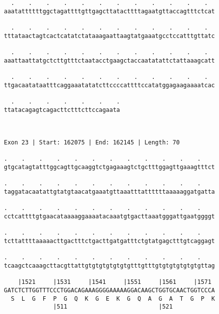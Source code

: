 \documentclass{article}
\begin{document}
\begin{Verbatim}
  .    .    .    .    .    .    .    .    .    .    .    .  
aaatattttttggctagattttgttgagcttatacttttagaatgttaccagtttctcat
                                                            
  .    .    .    .    .    .    .    .    .    .    .    .  
tttataactagtcactcatatctataaagaattaagtatgaaatgcctccatttgttatc
                                                            
  .    .    .    .    .    .    .    .    .    .    .    .  
aaattaattatgctcttgtttctaatacctgaagctaccaatatattctattaaagcatt
                                                            
  .    .    .    .    .    .    .    .    .    .    .    .  
ttgacaatataatttcaggaaatatatcttccccattttccatatggagaagaaaatcac
                                                            
  .    .    .    .    .    .    .
ttatacagagtcagacttctttcttccagaata
                                 
                                 
 
Exon 23 | Start: 162075 | End: 162145 | Length: 70
 
.    .    .    .    .    .    .    .    .    .    .    .    
gtgcatagtatttggcagttgcaaggtctgagaaagtctgctttggagttgaaagtttct
                                                            
.    .    .    .    .    .    .    .    .    .    .    .    
taggatacaatattgtatgtaacatgaaatgttaaatttattttttaaaaaggatgatta
                                                            
.    .    .    .    .    .    .    .    .    .    .    .    
cctcattttgtgaacataaaaggaaaatacaaatgtgacttaaatgggattgaatggggt
                                                            
.    .    .    .    .    .    .    .    .    .    .    .    
tcttattttaaaaacttgactttctgacttgatgatttctgtatgagctttgtcaggagt
                                                            
.    .    .    .    .    .    .    .    .    .    .    .    
tcaagctcaaagcttacgttattgtgtgtgtgtgtgtttgtttgtgtgtgtgtgtgttag
                                                            
    |1521     |1531     |1541     |1551     |1561     |1571 
GATCTCTTGGTTTCCCTGGACAGAAAGGGGAAAAAGGACAAGCTGGTGCAACTGGTCCCA
  S  L  G  F  P  G  Q  K  G  E  K  G  Q  A  G  A  T  G  P  K
              |511                          |521            
  

\end{Verbatim}
\end{document}
